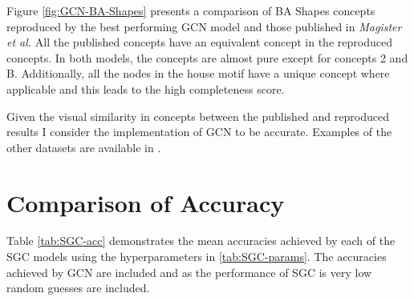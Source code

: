 %

Figure \ref{fig:GCN-BA-Shapes} presents a comparison of BA Shapes concepts reproduced by the best performing GCN model and those published in \textit{Magister et al.}
All the published concepts have an equivalent concept in the reproduced concepts.
In both models, the concepts are almost pure except for concepts 2 and B.
Additionally, all the nodes in the house motif have a unique concept where applicable and this leads to the high completeness score.

Given the visual similarity in concepts between the published and reproduced results I consider the implementation of GCN to be accurate.
Examples of the other datasets are available in .

\section{Comparison of Accuracy}
\label{sec:comp-acc}


Table \ref{tab:SGC-acc} demonstrates the mean accuracies achieved by each of the SGC models using the hyperparameters in \ref{tab:SGC-params}.
The accuracies achieved by GCN are included and as the performance of SGC is very low random guesses are included.

